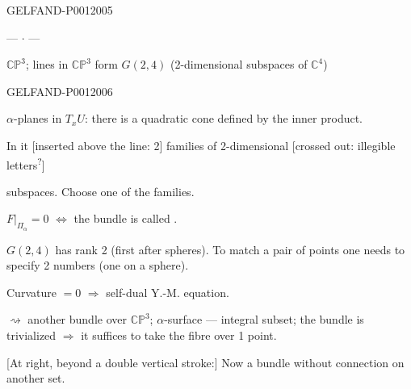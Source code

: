 \begin{GelfandAdjacentEvidence}{GELFAND-P001200}{5}


\begin{center}--- \(\cdot\) ---\end{center}

$\mathbb{CP}^3$; lines in $\mathbb{CP}^3$ form $G(2,4)$
(2-dimensional subspaces of $\mathbb C^4$)

\end{GelfandAdjacentEvidence}
\begin{GelfandAdjacentEvidence}{GELFAND-P001200}{6}


$\alpha$-planes in $T_xU$: there is a quadratic cone defined by the inner product.

In it [inserted above the line: 2] families of 2-dimensional [crossed out:
illegible letters\textsuperscript{?}]
\end{GelfandAdjacentEvidence}

subspaces. Choose one of the families.

$F|_{\Pi_\alpha}=0$ $\Longleftrightarrow$ the bundle is called .

$G(2,4)$ has rank 2 (first after spheres). To match a pair of points one needs to specify 2 numbers (one on a sphere).

Curvature $=0$ $\Longrightarrow$ self-dual Y.-M. equation.

$\rightsquigarrow$ another bundle over $\mathbb{CP}^3$;
$\alpha$-surface — integral subset; the bundle is trivialized $\Longrightarrow$ it suffices to take the fibre over 1 point.

[At right, beyond a double vertical stroke:] Now a bundle without connection on another set.


